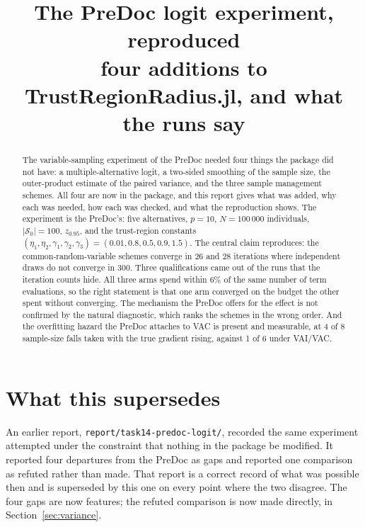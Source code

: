 \documentclass[11pt,a4paper]{article}
\title{The PreDoc logit experiment, reproduced\\
       \large four additions to \textsf{TrustRegionRadius.jl}, and what the runs say}
\author{}
\date{}
\newcommand{\VAIVAC}{\textsf{VAI/VAC}}
\newcommand{\VAC}{\textsf{VAC}}
\begin{document}
\maketitle

\begin{abstract}
The variable-sampling experiment of the PreDoc needed four things the package did
not have: a multiple-alternative logit, a two-sided smoothing of the sample size,
the outer-product estimate of the paired variance, and the three sample management
schemes. All four are now in the package, and this report gives what was added,
why each was needed, how each was checked, and what the reproduction shows. The
experiment is the PreDoc's: five alternatives, $p = 10$, $N = 100\,000$ individuals,
$\lvert\mathcal{S}_0\rvert = 100$, $z_{0.95}$, and the trust-region constants
$(\eta_1,\eta_2,\gamma_1,\gamma_2,\gamma_3) = (0.01, 0.8, 0.5, 0.9, 1.5)$. The
central claim reproduces: the common-random-variable schemes converge in 26 and 28
iterations where independent draws do not converge in 300. Three qualifications
came out of the runs that the iteration counts hide. All three arms spend within
6\% of the same number of term evaluations, so the right statement is that one arm
converged on the budget the other spent without converging. The mechanism the
PreDoc offers for the effect is not confirmed by the natural diagnostic, which
ranks the schemes in the wrong order. And the overfitting hazard the PreDoc
attaches to \VAC{} is present and measurable, at 4 of 8 sample-size falls taken
with the true gradient rising, against 1 of 6 under \VAIVAC{}.
\end{abstract}

\tableofcontents

\section{What this supersedes}

An earlier report, \texttt{report/task14-predoc-logit/}, recorded the same
experiment attempted under the constraint that nothing in the package be modified.
It reported four departures from the PreDoc as gaps and reported one comparison as
refuted rather than made. That report is a correct record of what was possible then
and is superseded by this one on every point where the two disagree. The four gaps
are now features; the refuted comparison is now made directly, in
Section~\ref{sec:variance}.
\end{document}
